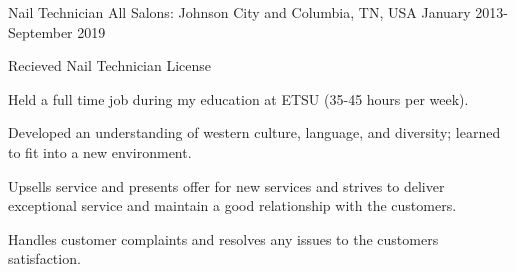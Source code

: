

\begin{cventries}

  \cventry
    {Nail Technician} %
    {All Salons:} %
    {Johnson City and Columbia, TN, USA} %
    {January 2013-September 2019} %
    {
      \begin{cvitems} %
      \item Recieved Nail Technician License
      \item Held a full time job during my education at ETSU (35-45 hours per week).
      \item Developed an understanding of western culture, language, and diversity; learned to fit into a new environment.
      \item Upsells service and presents offer for new services and strives to deliver exceptional service and maintain a good relationship with the customers.
      \item Handles customer complaints and resolves any issues to the customers satisfaction.
      \end{cvitems}
    }


\end{cventries}
